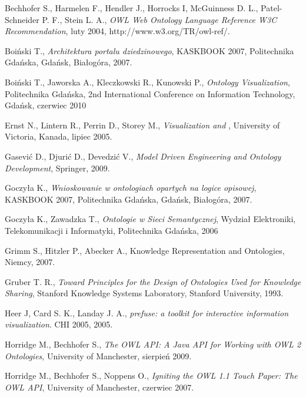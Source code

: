 \begin{thebibliography}{99}
  

 
   Bechhofer S.,  Harmelen F., Hendler J.,  Horrocks I,  McGuinness D. L.,  Patel-Schneider P. F., Stein L. A., \textit{OWL Web Ontology Language Reference W3C Recommendation}, luty 2004, http://www.w3.org/TR/owl-ref/.

   Boiński T., \textit{Architektura portalu dziedzinowego}, KASKBOOK 2007, Politechnika Gdańska, Gdańsk, Białogóra, 2007.

   Boiński T., Jaworska A., Kleczkowski R., Kunowski P., \textit{Ontology Visualization},  Politechnika Gdańska, 2nd International Conference on Information Technology, Gdańsk, czerwiec 2010

   Ernst N., Lintern R., Perrin D., Storey M., \textit{Visualization and \protege }, University of Victoria, Kanada, lipiec 2005.

   Gasević D., Djurić D., Devedzić V., \textit{Model Driven Engineering and Ontology Development}, Springer, 2009.

   Goczyła K., \textit{Wnioskowanie w ontologiach opartych na logice opisowej}, KASKBOOK 2007, Politechnika Gdańska, Gdańsk, Białogóra, 2007.

   Goczyła K., Zawadzka T., \textit{Ontologie w Sieci Semantycznej}, Wydział Elektroniki, Telekomunikacji i Informatyki, Politechnika Gdańska, 2006

   Grimm S., Hitzler P., Abecker A., Knowledge Representation and Ontologies, Niemcy, 2007.

   Gruber T. R., \textit{Toward Principles for the Design of Ontologies Used for Knowledge Sharing}, Stanford Knowledge Systems Laboratory, Stanford University, 1993. 

   Heer J, Card S. K., Landay J. A., \textit{prefuse: a toolkit for interactive information visualization}. CHI 2005, 2005.

   Horridge M., Bechhofer S., \textit{The OWL API: A Java API for Working with OWL 2 Ontologies}, University of Manchester, sierpień 2009.

   Horridge M., Bechhofer S., Noppens O., \textit{Igniting the OWL 1.1 Touch Paper: The OWL API}, University of Manchester, czerwiec 2007.


\end{thebibliography}
